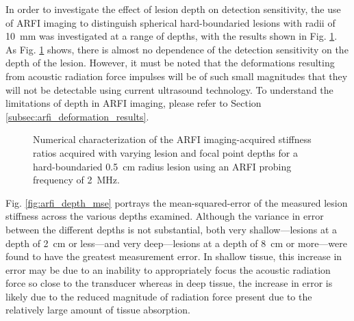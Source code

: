 
			In order to investigate the effect of lesion depth on detection sensitivity, the use of ARFI imaging to distinguish spherical hard-boundaried lesions with radii of \SI{10}{\mm} was investigated at a range of depths, with the results shown in Fig. \ref{fig:arfi_depth}. As Fig. \ref{fig:arfi_depth} shows, there is almost no dependence of the detection sensitivity on the depth of the lesion. However, it must be noted that the deformations resulting from acoustic radiation force impulses will be of such small magnitudes that they will not be detectable using current ultrasound technology. To understand the limitations of depth in ARFI imaging, please refer to Section \ref{subsec:arfi_deformation_results}.

			\begin{figure}[!htb]
				\centering
				\caption[Numerical characterization of ARFI imaging-acquired stiffness ratio with changing lesion depth]{Numerical characterization of the ARFI imaging-acquired stiffness ratios acquired with varying lesion and focal point depths for a hard-boundaried \SI{0.5}{cm} radius lesion using an ARFI probing frequency of \SI{2}{\MHz}.}
				\label{fig:arfi_depth}
			\end{figure}

			Fig. \ref{fig:arfi_depth_mse} portrays the mean-squared-error of the measured lesion stiffness across the various depths examined. Although the variance in error between the different depths is not substantial, both very shallow---lesions at a depth of \SI{2}{\cm} or less---and very deep---lesions at a depth of \SI{8}{\cm} or more---were found to have the greatest measurement error. In shallow tissue, this increase in error may be due to an inability to appropriately focus the acoustic radiation force so close to the transducer whereas in deep tissue, the increase in error is likely due to the reduced magnitude of radiation force present due to the relatively large amount of tissue absorption.

